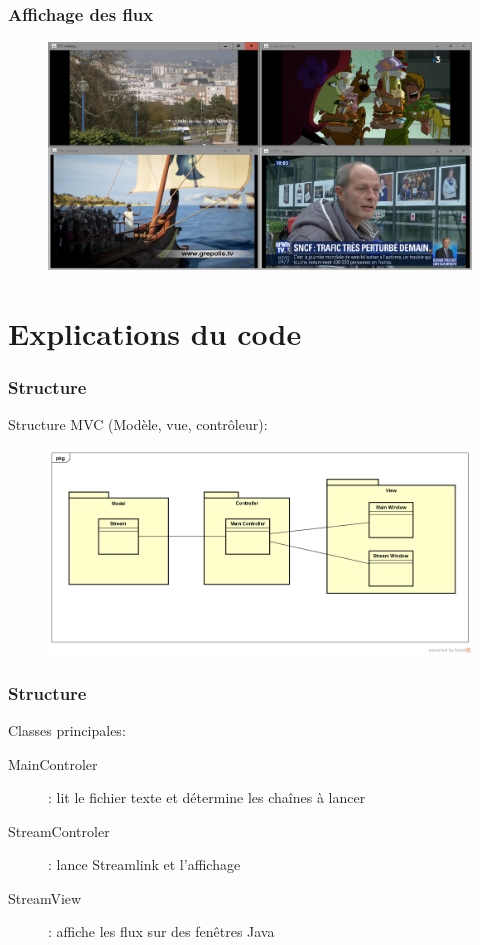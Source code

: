 \documentclass{beamer}
\begin{document}
\begin{frame}
\frametitle{Affichage des flux}

\begin{figure}
	\includegraphics[scale=0.25]{images/affichageFlux}
\end{figure}

\end{frame}


\section{Explications du code}

\begin{frame}
\frametitle{Structure}

Structure MVC (Modèle, vue, contrôleur): 

\begin{figure}
	\includegraphics[scale=0.25]{images/ClassDiagram}
\end{figure}

\end{frame}

\begin{frame}
\frametitle{Structure}

Classes principales:
\begin{description}
	\item[MainControler] : lit le fichier texte et détermine les chaînes à lancer
	\item[StreamControler] : lance Streamlink et l'affichage
	\item[StreamView] : affiche les flux sur des fenêtres Java
\end{description}

\end{frame}
\end{document}
